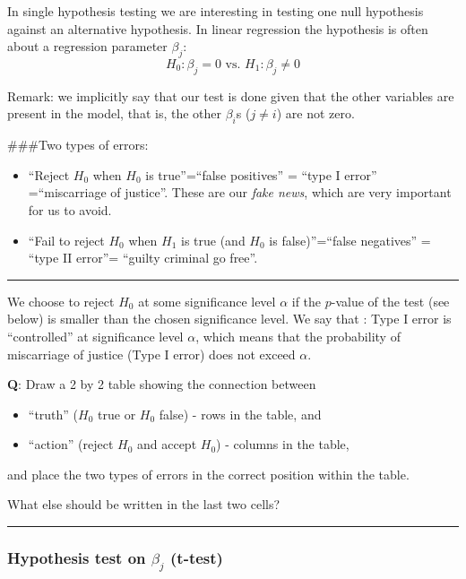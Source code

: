 \documentclass[
]{article}
\providecommand{\tightlist}{%
  \setlength{\itemsep}{0pt}\setlength{\parskip}{0pt}}
\begin{document}
In single hypothesis testing we are interesting in testing one null
hypothesis against an alternative hypothesis. In linear regression the
hypothesis is often about a regression parameter \(\beta_j\):
\[H_0: \beta_j=0 \text{ vs. } H_1: \beta_j\neq 0\]

Remark: we implicitly say that our test is done given that the other
variables are present in the model, that is, the other \(\beta_i\)s
(\(j\neq i\)) are not zero.

\#\#\#Two types of errors:

\begin{itemize}
\item
  ``Reject \(H_0\) when \(H_0\) is true''=``false positives'' = ``type I
  error'' =``miscarriage of justice''. These are our \emph{fake news},
  which are very important for us to avoid.
\item
  ``Fail to reject \(H_0\) when \(H_1\) is true (and \(H_0\) is
  false)''=``false negatives'' = ``type II error''= ``guilty criminal go
  free''.
\end{itemize}

\begin{center}\rule{0.5\linewidth}{0.5pt}\end{center}

We choose to reject \(H_0\) at some significance level \(\alpha\) if the
\(p\)-value of the test (see below) is smaller than the chosen
significance level. We say that : Type I error is ``controlled'' at
significance level \(\alpha\), which means that the probability of
miscarriage of justice (Type I error) does not exceed \(\alpha\).

\textbf{Q}: Draw a 2 by 2 table showing the connection between

\begin{itemize}
\tightlist
\item
  ``truth'' (\(H_0\) true or \(H_0\) false) - rows in the table, and
\item
  ``action'' (reject \(H_0\) and accept \(H_0\)) - columns in the table,
\end{itemize}

and place the two types of errors in the correct position within the
table.

What else should be written in the last two cells?

\begin{center}\rule{0.5\linewidth}{0.5pt}\end{center}

\hypertarget{hypothesis-test-on-beta_j-t-test}{%
\subsubsection{\texorpdfstring{Hypothesis test on \(\beta_j\)
(t-test)}{Hypothesis test on \textbackslash beta\_j (t-test)}}\label{hypothesis-test-on-beta_j-t-test}}
\end{document}
